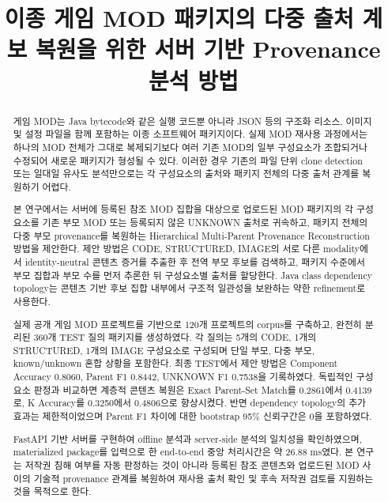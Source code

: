\documentclass[runningheads]{llncs}
\begin{document}
\title{이종 게임 MOD 패키지의 다중 출처 계보 복원을 위한 서버 기반 Provenance 분석 방법}

\author{}
\authorrunning{}
\institute{}

\maketitle

\begin{abstract}
게임 MOD는 Java bytecode와 같은 실행 코드뿐 아니라 JSON 등의 구조화 리소스,
이미지 및 설정 파일을 함께 포함하는 이종 소프트웨어 패키지이다. 실제 MOD
재사용 과정에서는 하나의 MOD 전체가 그대로 복제되기보다 여러 기존 MOD의
일부 구성요소가 조합되거나 수정되어 새로운 패키지가 형성될 수 있다. 이러한
경우 기존의 파일 단위 clone detection 또는 일대일 유사도 분석만으로는 각
구성요소의 출처와 패키지 전체의 다중 출처 관계를 복원하기 어렵다.

본 연구에서는 서버에 등록된 참조 MOD 집합을 대상으로 업로드된 MOD 패키지의
각 구성요소를 기존 부모 MOD 또는 등록되지 않은 UNKNOWN 출처로 귀속하고,
패키지 전체의 다중 부모 provenance를 복원하는 Hierarchical Multi-Parent
Provenance Reconstruction 방법을 제안한다. 제안 방법은 CODE, STRUCTURED,
IMAGE의 서로 다른 modality에서 identity-neutral 콘텐츠 증거를 추출한 후
전역 부모 후보를 검색하고, 패키지 수준에서 부모 집합과 부모 수를 먼저 추론한
뒤 구성요소별 출처를 할당한다. Java class dependency topology는 콘텐츠
기반 후보 집합 내부에서 구조적 일관성을 보완하는 약한 refinement로 사용한다.

실제 공개 게임 MOD 프로젝트를 기반으로 120개 프로젝트의 corpus를 구축하고,
완전히 분리된 360개 TEST 질의 패키지를 생성하였다. 각 질의는 5개의 CODE,
1개의 STRUCTURED, 1개의 IMAGE 구성요소로 구성되며 단일 부모, 다중 부모,
known/unknown 혼합 상황을 포함한다. 최종 TEST에서 제안 방법은 Component
Accuracy 0.8060, Parent F1 0.8442, UNKNOWN F1 0.7538을 기록하였다. 독립적인
구성요소 판정과 비교하면 계층적 콘텐츠 복원은 Exact Parent-Set Match를
0.2861에서 0.4139로, K Accuracy를 0.3250에서 0.4806으로 향상시켰다.
반면 dependency topology의 추가 효과는 제한적이었으며 Parent F1 차이에 대한
bootstrap 95\% 신뢰구간은 0을 포함하였다.

FastAPI 기반 서버를 구현하여 offline 분석과 server-side 분석의 일치성을
확인하였으며, materialized package를 입력으로 한 end-to-end 중앙 처리시간은
약 26.88 ms였다. 본 연구는 저작권 침해 여부를 자동 판정하는 것이 아니라
등록된 참조 콘텐츠와 업로드된 MOD 사이의 기술적 provenance 관계를 복원하여
재사용 출처 확인 및 후속 저작권 검토를 지원하는 것을 목적으로 한다.

\end{abstract}
\end{document}
